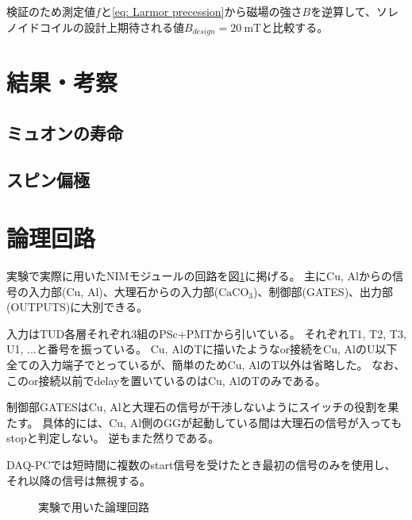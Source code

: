 \documentclass[dvipdfmx]{jsarticle}
\renewcommand{\theequation}{\thesection.\arabic{equation}}
\renewcommand{\thefigure}{\thesection.\arabic{figure}}
\renewcommand{\thetable}{\thesection.\arabic{table}}
\begin{document}
検証のため測定値$f$と\eqref{eq: Larmor precession}から磁場の強さ$B$を逆算して、ソレノイドコイルの設計上期待される値$B_{design}=\SI{20}{\milli\tesla}$と比較する。


\section{結果・考察}
\subsection{ミュオンの寿命}

\subsection{スピン偏極}



\appendix
\setcounter{section}{0}
\setcounter{equation}{1}
\setcounter{figure}{1}
\setcounter{table}{1}
\renewcommand{\theequation}{\Alph{section}.\arabic{equation} }
\renewcommand{\thefigure}{\Alph{section}.\arabic{equation} }
\renewcommand{\thetable}{\Alph{section}.\arabic{equation} }


\section{論理回路}
\label{sec: logic circuit}

実験で実際に用いたNIMモジュールの回路を図\ref{fig: full circuit}に掲げる。
主にCu, Alからの信号の入力部(Cu, Al)、大理石からの入力部($\mathrm{CaCO_3}$)、制御部(GATES)、出力部(OUTPUTS)に大別できる。

入力はTUD各層それぞれ3組のPSc+PMTから引いている。
それぞれT1, T2, T3, U1, ...と番号を振っている。
Cu, AlのTに描いたようなor接続をCu, AlのU以下全ての入力端子でとっているが、簡単のためCu, AlのT以外は省略した。
なお、このor接続以前でdelayを置いているのはCu, AlのTのみである。

制御部GATESはCu, Alと大理石の信号が干渉しないようにスイッチの役割を果たす。
具体的には、Cu, Al側のGGが起動している間は大理石の信号が入ってもstopと判定しない。
逆もまた然りである。

DAQ-PCでは短時間に複数のstart信号を受けたとき最初の信号のみを使用し、それ以降の信号は無視する。

\begin{landscape}
    \begin{figure}
        \centering
        
        \caption{実験で用いた論理回路}
        \label{fig: full circuit}
    \end{figure}
\end{landscape}
\end{document}
